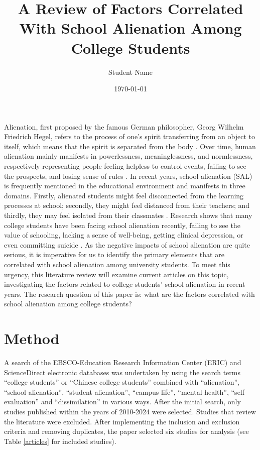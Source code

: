 \documentclass{scupi_apa_thesis}
\title{A Review of Factors Correlated With School Alienation Among College Students}
\author{Student Name}
\institute{Sichuan University-Pittsburgh Institute}
\date{\today}
\begin{document}
\maketitle
\par
Alienation, first proposed by the famous German philosopher, Georg Wilhelm Friedrich Hegel, refers to the process of one's spirit transferring from an object to itself, which means that the spirit is separated from the body \cite{hegel2018phenomenology}. 
Over time, human alienation mainly manifests in powerlessness, meaninglessness, and normlessness, respectively representing people feeling helpless to control events, failing to see the prospects, and losing sense of rules \cite{brown2003secondary}. 
In recent years, school alienation (SAL) is frequently mentioned in the educational environment and manifests in three domains. 
Firstly, alienated students might feel disconnected from the learning processes at school; secondly, they might feel distanced from their teachers; 
and thirdly, they may feel isolated from their classmates \cite{morinaj2018school}. 
Research shows that many college students have been facing school alienation recently, failing to see the value of schooling, lacking a sense of well-being, getting clinical depression, or even committing suicide \cite{zhang2003daxuesheng}. 
As the negative impacts of school alienation are quite serious, it is imperative for us to identify the primary elements that are correlated with school alienation among university students. 
To meet this urgency, this literature review will examine current articles on this topic, investigating the factors related to college students’ school alienation in recent years. 
The research question of this paper is: what are the factors correlated with school 
alienation among college students? 

\section{Method}
A search of the EBSCO-Education Research Information Center (ERIC) and ScienceDirect electronic databases was undertaken by using the search terms “college students” or “Chinese college students” combined with “alienation”, “school alienation”, “student alienation”, “campus life”, “mental health”, “self-evaluation” and “dissimilation” in various ways. 
After the initial search, only studies published within the years of 2010-2024 were selected. 
Studies that review the literature were excluded. 
After implementing the inclusion and exclusion criteria and removing duplicates, the paper selected six studies for analysis (see Table \ref{articles} for included studies).
\end{document}
